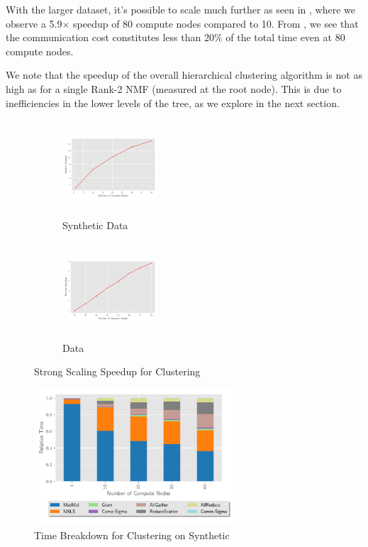 With the larger \image{} dataset, it's possible to scale much further as seen in , where we observe a 5.9$\times$ speedup of 80 compute nodes compared to 10.
From , we see that the communication cost constitutes less than 20\% of the total time even at 80 compute nodes. 

We note that the speedup of the overall hierarchical clustering algorithm is not as high as for a single Rank-2 NMF (measured at the root node).
This is due to inefficiencies in the lower levels of the tree, as we explore in the next section.


\begin{figure}
\begin{subfigure}{1.5in}
\begin{center}
\includegraphics[height=1.4in, width=1.4in]{plots/synthetic_hierarchical_speedup.pdf}
\caption{Synthetic Data}
\label{fig:synhierspeedup}
\end{center}
\end{subfigure}
\begin{subfigure}{1.5in}
\begin{center}
\includegraphics[height=1.4in, width=1.4in]{plots/realworld_hierarchical_speedup.pdf}
\caption{\image{} Data}
\label{fig:rwhierspeedup}
\end{center}
\end{subfigure}
\caption{Strong Scaling Speedup for Clustering}
\label{fig:rank2speedup}
\end{figure}

\begin{figure}
\begin{center}
\includegraphics[height=2in, width=\columnwidth]{plots/synthetic_hier_strongscaling.pdf}
\caption{Time Breakdown for Clustering on Synthetic}
\label{fig:synhierstrongscaling}
\end{center}
\end{figure}


